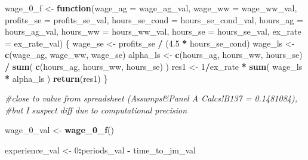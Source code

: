 \documentclass[]{article}
\newenvironment{Shaded}{\begin{snugshade}}{\end{snugshade}}
\newcommand{\CommentTok}[1]{\textcolor[rgb]{0.56,0.35,0.01}{\textit{#1}}}
\newcommand{\ControlFlowTok}[1]{\textcolor[rgb]{0.13,0.29,0.53}{\textbf{#1}}}
\newcommand{\DataTypeTok}[1]{\textcolor[rgb]{0.13,0.29,0.53}{#1}}
\newcommand{\DecValTok}[1]{\textcolor[rgb]{0.00,0.00,0.81}{#1}}
\newcommand{\FloatTok}[1]{\textcolor[rgb]{0.00,0.00,0.81}{#1}}
\newcommand{\KeywordTok}[1]{\textcolor[rgb]{0.13,0.29,0.53}{\textbf{#1}}}
\newcommand{\NormalTok}[1]{#1}
\newcommand{\OperatorTok}[1]{\textcolor[rgb]{0.81,0.36,0.00}{\textbf{#1}}}
\newcommand{\StringTok}[1]{\textcolor[rgb]{0.31,0.60,0.02}{#1}}
\begin{document}
\begin{Shaded}
\begin{Highlighting}[]
\NormalTok{wage_}\DecValTok{0}\NormalTok{_f <-}\StringTok{ }\ControlFlowTok{function}\NormalTok{(}\DataTypeTok{wage_ag =}\NormalTok{ wage_ag_val, }
                     \DataTypeTok{wage_ww =}\NormalTok{ wage_ww_val, }
                     \DataTypeTok{profits_se =}\NormalTok{ profits_se_val, }
                     \DataTypeTok{hours_se_cond =}\NormalTok{ hours_se_cond_val, }
                     \DataTypeTok{hours_ag =}\NormalTok{ hours_ag_val, }
                     \DataTypeTok{hours_ww =}\NormalTok{ hours_ww_val, }
                     \DataTypeTok{hours_se =}\NormalTok{ hours_se_val, }
                     \DataTypeTok{ex_rate =}\NormalTok{ ex_rate_val) \{}
\NormalTok{  wage_se <-}\StringTok{ }\NormalTok{profits_se }\OperatorTok{/}\StringTok{ }\NormalTok{(}\FloatTok{4.5} \OperatorTok{*}\StringTok{ }\NormalTok{hours_se_cond)}
\NormalTok{  wage_ls <-}\StringTok{ }\KeywordTok{c}\NormalTok{(wage_ag, wage_ww, wage_se)}
\NormalTok{  alpha_ls <-}\StringTok{ }\KeywordTok{c}\NormalTok{(hours_ag, hours_ww, hours_se) }\OperatorTok{/}\StringTok{ }\KeywordTok{sum}\NormalTok{( }\KeywordTok{c}\NormalTok{(hours_ag, hours_ww, hours_se) )}
\NormalTok{  res1 <-}\StringTok{ }\DecValTok{1}\OperatorTok{/}\NormalTok{ex_rate }\OperatorTok{*}\StringTok{ }\KeywordTok{sum}\NormalTok{( wage_ls }\OperatorTok{*}\StringTok{ }\NormalTok{alpha_ls )}
  \KeywordTok{return}\NormalTok{(res1)}
\NormalTok{\}}

\CommentTok{#close to value from spreadsheet (Assumps&Panel A Calcs!B137 = 0.1481084), }
\CommentTok{#but I suspect diff due to computational precision }

\NormalTok{wage_}\DecValTok{0}\NormalTok{_val <-}\StringTok{ }\KeywordTok{wage_0_f}\NormalTok{()  }

\NormalTok{experience_val <-}\StringTok{ }\DecValTok{0}\OperatorTok{:}\NormalTok{periods_val }\OperatorTok{-}\StringTok{ }\NormalTok{time_to_jm_val}


\end{Highlighting}
\end{Shaded}
\end{document}

